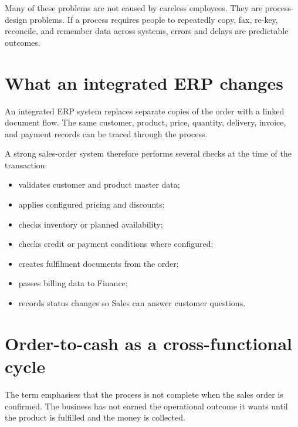 \begin{pitfall}
Many of these problems are not caused by careless employees. They are process-design problems. If a process requires people to repeatedly copy, fax, re-key, reconcile, and remember data across systems, errors and delays are predictable outcomes.
\end{pitfall}

\section{What an integrated ERP changes}

An integrated ERP system replaces separate copies of the order with a linked document flow. The same customer, product, price, quantity, delivery, invoice, and payment records can be traced through the process.

A strong sales-order system therefore performs several checks at the time of the transaction:

\begin{itemize}
  \item validates customer and product master data;
  \item applies configured pricing and discounts;
  \item checks inventory or planned availability;
  \item checks credit or payment conditions where configured;
  \item creates fulfilment documents from the order;
  \item passes billing data to Finance;
  \item records status changes so Sales can answer customer questions.
\end{itemize}

\section{Order-to-cash as a cross-functional cycle}

The term  emphasises that the process is not complete when the sales order is confirmed. The business has not earned the operational outcome it wants until the product is fulfilled and the money is collected.

